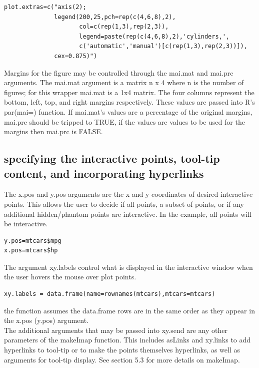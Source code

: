 \documentclass[]{article}
\begin{document}
\begin{verbatim}
plot.extras=c("axis(2);
              legend(200,25,pch=rep(c(4,6,8),2),
                     col=c(rep(1,3),rep(2,3)),
                     legend=paste(rep(c(4,6,8),2),'cylinders,',
                     c('automatic','manual')[c(rep(1,3),rep(2,3))]),
              cex=0.875)")
\end{verbatim}

\indent Margins for the figure may be controlled through the mai.mat and mai.prc arguments. The mai.mat argument is a matrix n x 4 where n is the number of figures; for this wrapper mai.mat is a 1x4 matrix. The four columns represent the bottom, left, top, and right margins respectively. These values are passed into R's par(mai=) function. If mai.mat's values are a percentage of the original margins, mai.prc should be tripped to TRUE, if the values are values to be used for the margins then mai.prc is FALSE.


\subsection{specifying the interactive points, tool-tip content, and incorporating hyperlinks}

\indent The x.pos and y.pos arguments are the x and y coordinates of desired interactive points. This allows the user to decide if all points, a subset of points, or if any additional hidden/phantom points are interactive. In the example, all points will be interactive. 

\begin{verbatim}
y.pos=mtcars$mpg
x.pos=mtcars$hp
\end{verbatim}


\indent The argument xy.labels control what is displayed in the interactive window when the user hovers the mouse over plot points. 


\begin{verbatim}
xy.labels = data.frame(name=rownames(mtcars),mtcars=mtcars)
\end{verbatim}

 the function assumes the data.frame rows are in the same order as they appear in the x.pos (y.pos) argument. \newline
\\


\indent The additional arguments that may be passed into xy.send are any other parameters of the makeImap function. This includes asLinks and xy.links to add hyperlinks to tool-tip or to make the points themselves hyperlinks, as well as arguments for tool-tip display. See section 5.3 for more details on makeImap. 
\end{document}
